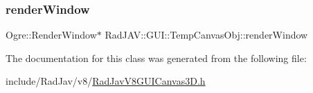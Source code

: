 \subsubsection{\texorpdfstring{render\+Window}{renderWindow}}
{\footnotesize\ttfamily Ogre\+::\+Render\+Window$\ast$ Rad\+J\+A\+V\+::\+G\+U\+I\+::\+Temp\+Canvas\+Obj\+::render\+Window}



The documentation for this class was generated from the following file\+:\begin{DoxyCompactItemize}
\item 
include/\+Rad\+Jav/v8/\mbox{\hyperlink{_rad_jav_v8_g_u_i_canvas3_d_8h}{Rad\+Jav\+V8\+G\+U\+I\+Canvas3\+D.\+h}}\end{DoxyCompactItemize}
